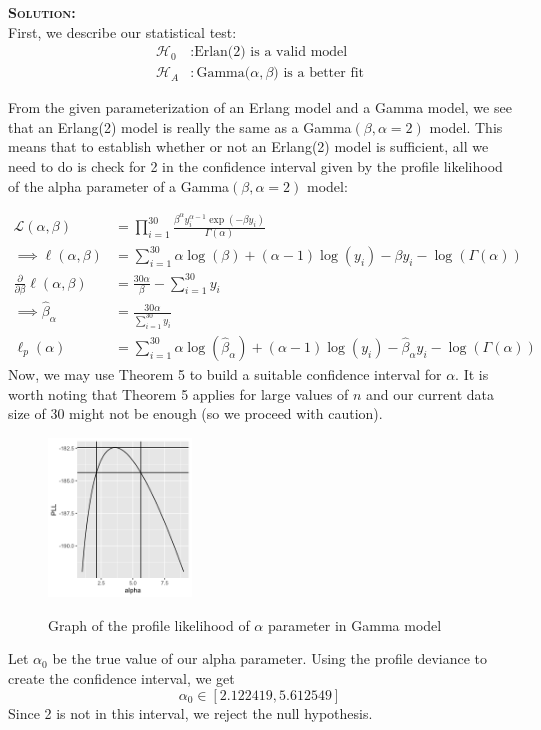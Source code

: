 \documentclass[12pt,oneside]{article}
\newenvironment{solution}
    {\textbf{\textsc{Solution:}}\\}
    {\newpage}
\def\l{\ell}
\def\pt{\partial}
\begin{document}
\begin{solution}
First, we describe our statistical test:
\begin{align*}
    \mathcal{H}_0&: \text{Erlan(2) is a valid model}\\
    \mathcal{H}_A&: \text{Gamma($\alpha,\beta$) is a better fit}
\end{align*}

From the given parameterization of an Erlang model and a Gamma model, we see that an Erlang(2) model is really the same as a Gamma$(\beta,\alpha=2)$ model. This means that to establish whether or not an Erlang(2) model is sufficient, all we need to do is check for 2 in the confidence interval given by the profile likelihood of the alpha parameter of a Gamma$(\beta,\alpha=2)$ model:

\begin{align*}
    \mathcal{L}(\alpha,\beta)&= \prod_{i=1}^{30} \frac{\beta^\alpha y_i^{\alpha -1} \exp(-\beta y_i)}{\Gamma(\alpha)}\\
    \implies \l(\alpha,\beta)&=\sum_{i=1}^{30} \alpha\log(\beta)+(\alpha-1)\log(y_i) -\beta y_i - \log(\Gamma(\alpha))\\
    \frac{\pt}{\pt\beta}\l(\alpha,\beta)&= \frac{30\alpha}{\beta}-\sum_{i=1}^{30}y_i\\
    \implies \hat{\beta}_\alpha&= \frac{30\alpha}{\sum_{i=1}^{30}y_i}\\
    \l_p(\alpha)&=\sum_{i=1}^{30} \alpha\log(\hat{\beta}_\alpha)+(\alpha-1)\log(y_i) -\hat{\beta}_\alpha y_i - \log(\Gamma(\alpha))
\end{align*}
Now, we may use Theorem 5 to build a suitable confidence interval for $\alpha$. It is worth noting that Theorem 5 applies for large values of $n$ and our current data size of $30$ might not be enough (so we proceed with caution).
\begin{figure}[H]
\begin{center}
{\includegraphics[width=1.5in]{a1/pll-alpha.png}}
\caption{Graph of the profile likelihood of $\alpha$ parameter in Gamma model}
\end{center}
\end{figure}
Let $\alpha_0$ be the true value of our alpha parameter. Using the profile deviance to create the confidence interval, we get \[\alpha_0\in [2.122419,5.612549]\]
Since 2 is not in this interval, we reject the null hypothesis.
\end{solution}
\end{document}
